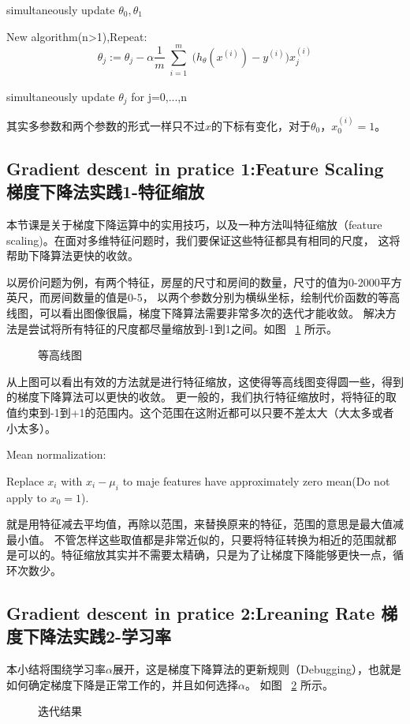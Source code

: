 \documentclass[UTF8]{ctexart}
\begin{document}
simultaneously update $\theta_0,\theta_1$

New algorithm(n>1),Repeat:
\begin{equation*}
  \theta_j := \theta_j - \alpha
  \frac{1}{m}
  \sum^m_{\substack{i=1}}
   \Big(h_\theta(x^{(i)})-y^{(i)}\Big)x_j^{(i)}
\end{equation*}

simultaneously update $\theta_j$ for j=0,...,n

其实多参数和两个参数的形式一样只不过$x$的下标有变化，对于$\theta_0$，$x_0^{(i)}=1$。
\subsection{Gradient descent in pratice 1:Feature Scaling 梯度下降法实践1-特征缩放}
本节课是关于梯度下降运算中的实用技巧，以及一种方法叫特征缩放（feature scaling)。在面对多维特征问题时，我们要保证这些特征都具有相同的尺度，
这将帮助下降算法更快的收敛。

以房价问题为例，有两个特征，房屋的尺寸和房间的数量，尺寸的值为0-2000平方英尺，而房间数量的值是0-5，
以两个参数分别为横纵坐标，绘制代价函数的等高线图，可以看出图像很扁，梯度下降算法需要非常多次的迭代才能收敛。
解决方法是尝试将所有特征的尺度都尽量缩放到-1到1之间。如图 ~\ref{fig:2} 所示。
\newline


\begin{figure}[htb]
 \caption{等高线图}
 \label{fig:2}
 \end{figure}
从上图可以看出有效的方法就是进行特征缩放，这使得等高线图变得圆一些，得到的梯度下降算法可以更快的收敛。
更一般的，我们执行特征缩放时，将特征的取值约束到-1到+1的范围内。这个范围在这附近都可以只要不差太大（大太多或者小太多）。

Mean normalization:

Replace $x_i$ with $x_i-\mu_i$ to maje features have approximately zero mean(Do not apply to $x_0=1$).

就是用特征减去平均值，再除以范围，来替换原来的特征，范围的意思是最大值减最小值。
不管怎样这些取值都是非常近似的，只要将特征转换为相近的范围就都是可以的。特征缩放其实并不需要太精确，只是为了让梯度下降能够更快一点，循环次数少。
\subsection{Gradient descent in pratice 2:Lreaning Rate 梯度下降法实践2-学习率}
本小结将围绕学习率$\alpha$展开，这是梯度下降算法的更新规则（Debugging），也就是如何确定梯度下降是正常工作的，并且如何选择$\alpha$。
如图 ~\ref{fig:3} 所示。
\begin{figure}[htb]
 \caption{迭代结果}
 \label{fig:3}
 \end{figure}
\end{document}
